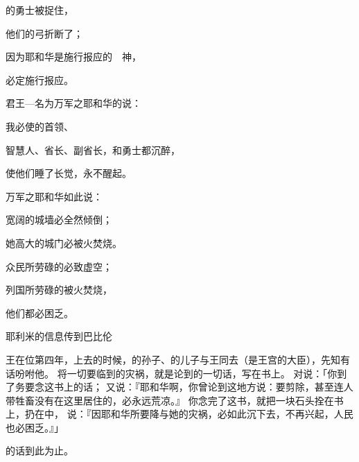 {\par }{的勇士被捉住，
\par }{\Q 他们的弓折断了；
\par }{\Q 因为耶和华是施行报应的　神，
\par }{\Q 必定施行报应。
\par }{\Q {}君王—名为万军之耶和华的说：
\par }{\Q 我必使{}的首领、
\par }{\Q 智慧人、省长、副省长，和勇士都沉醉，
\par }{\Q 使他们睡了长觉，永不醒起。
\par }{\BB \par }{\Q {}万军之耶和华如此说：
\par }{宽阔的城墙必全然倾倒；
\par }{\Q 她高大的城门必被火焚烧。
\par }{\Q 众民所劳碌的必致虚空；
\par }{\Q 列国所劳碌的被火焚烧，
\par }{\Q 他们都必困乏。
\par }{\SH 耶利米的信息传到巴比伦
\par }{\PP {}王{}在位第四年，上{}去的时候，{}的孙子、{}的儿子{}与王同去（{}是王宫的大臣），先知{}有话吩咐他。
将一切要临到{}的灾祸，就是论到{}的一切话，写在书上。
对{}说：「你到了{}务要念这书上的话；
又说：『耶和华啊，你曾论到这地方说：要剪除，甚至连人带牲畜没有在这里居住的，必永远荒凉。』
你念完了这书，就把一块石头拴在书上，扔在{}中，
说：『{}因耶和华所要降与她的灾祸，必如此沉下去，不再兴起，人民也必困乏。』」
\par }{的话到此为止。

}
